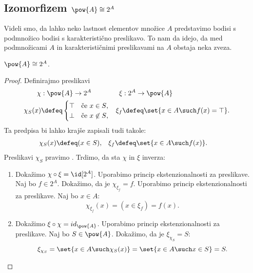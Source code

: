 \subsection{Izomorfizem \texorpdfstring{$\pow{A} \cong 2^A$}{P(A) ≅ 2^A}}

Videli smo, da lahko neko lastnost elementov množice $A$ predstavimo bodisi s
podmnožico bodisi s karakteristično preslikavo. To nam da idejo, da med
podmnožicami $A$ in karakterističnimi preslikavami na $A$ obstaja neka zveza.

\begin{izrek}
  $\pow{A} \cong 2^A$.
\end{izrek}

\begin{proof}
  Definirajmo preslikavi
  \begin{align*}
    \chi &: \pow{A} \to 2^A &
    \xi &: 2^A \to \pow{A} \\
    \chi_S(x) &\defeq
      \begin{cases}
        \top & \text{če $x \in S$,} \\
        \bot & \text{če $x \not\in S$,}
      \end{cases}
    &
    \xi_f &\defeq \set{x \in A \such f(x) = \top}.
  \end{align*}
  Ta predpisa bi lahko krajše zapisali tudi takole:
  \begin{align*}
  \chi_S(x) &\defeq (x \in S), &
  \xi_f &\defeq \set{x \in A \such f(x) }.
  \end{align*}
  Preslikavi $\chi_S$ pravimo .
  Trdimo, da sta $\chi$ in $\xi$ inverza:
  \begin{enumerate}
  \item 
    Dokažimo $\chi \circ \xi = \id[2^A]$. Uporabimo princip ekstenzionalnosti za preslikave.
    Naj bo $f \in 2^A$. Dokažimo, da je $\chi_{\xi_f} = f$.
    Uporabimo princip ekstenzionalnosti za preslikave. Naj bo $x \in A$:
    \begin{equation*}
      \chi_{\xi_f}(x) = (x \in \xi_f) = f(x).
    \end{equation*}

  \item
    Dokažimo $\xi \circ \chi = id_{\pow{A}}$. Uporabimo princip ekstenzionalnosti za preslikave. Naj bo $S \in \pow{A}$. Dokažimo, da je $\xi_{\chi_S} = S$:
    \begin{equation*}
      \xi_{\chi_S} = \set{x \in A \such \chi_S(x)} = \set{x \in A \such x \in S} = S.
    \end{equation*}
  \end{enumerate}
\end{proof}

